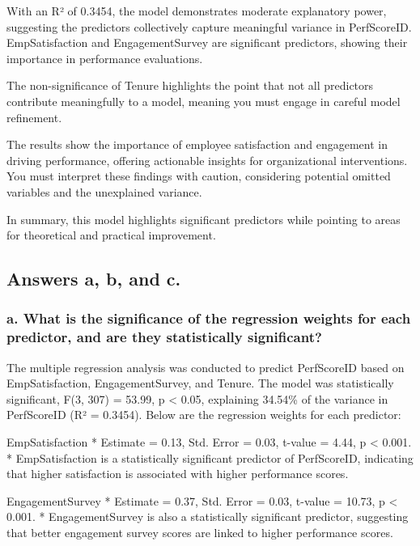 \documentclass[
]{article}
\begin{document}
With an R² of 0.3454, the model demonstrates moderate explanatory power,
suggesting the predictors collectively capture meaningful variance in
PerfScoreID. EmpSatisfaction and EngagementSurvey are significant
predictors, showing their importance in performance evaluations.

The non-significance of Tenure highlights the point that not all
predictors contribute meaningfully to a model, meaning you must engage
in careful model refinement.

The results show the importance of employee satisfaction and engagement
in driving performance, offering actionable insights for organizational
interventions. You must interpret these findings with caution,
considering potential omitted variables and the unexplained variance.

In summary, this model highlights significant predictors while pointing
to areas for theoretical and practical improvement.

\subsection{Answers a, b, and c.}\label{answers-a-b-and-c.}

\subsubsection{a. What is the significance of the regression weights for
each predictor, and are they statistically
significant?}\label{a.-what-is-the-significance-of-the-regression-weights-for-each-predictor-and-are-they-statistically-significant}

The multiple regression analysis was conducted to predict PerfScoreID
based on EmpSatisfaction, EngagementSurvey, and Tenure. The model was
statistically significant, F(3, 307) = 53.99, p \textless{} 0.05,
explaining 34.54\% of the variance in PerfScoreID (R² = 0.3454). Below
are the regression weights for each predictor:

EmpSatisfaction * Estimate = 0.13, Std. Error = 0.03, t-value = 4.44, p
\textless{} 0.001. * EmpSatisfaction is a statistically significant
predictor of PerfScoreID, indicating that higher satisfaction is
associated with higher performance scores.

EngagementSurvey * Estimate = 0.37, Std. Error = 0.03, t-value = 10.73,
p \textless{} 0.001. * EngagementSurvey is also a statistically
significant predictor, suggesting that better engagement survey scores
are linked to higher performance scores.
\end{document}

